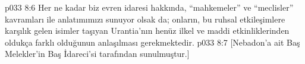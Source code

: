 \vs p033 8:6 Her ne kadar biz evren idaresi hakkında, “mahkemeler” ve “meclisler” kavramları ile anlatımımızı sunuyor olsak da; onların, bu ruhsal etkileşimlere karşılık gelen isimler taşıyan Urantia’nın henüz ilkel ve maddi etkinliklerinden oldukça farklı olduğunun anlaşılması gerekmektedir.
\vs p033 8:7 [Nebadon’a ait Baş Melekler’in Baş İdareci’si tarafından sunulmuştur.]
